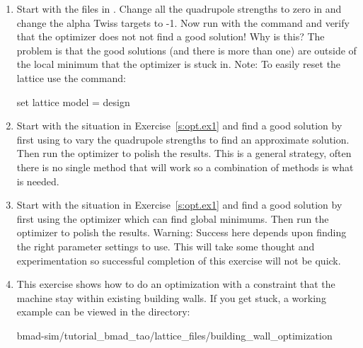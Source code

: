 \documentclass{hitec}     %
\begin{document}
{\begin{enumerate}[label=\thesection.\arabic{enumi}]
\item
\label{s:opt.ex1}
Start with the files in . Change
all the quadrupole strengths to zero in  and change the alpha Twiss  targets
to -1. Now run with the  command and verify that the optimizer does not not find a good
solution! Why is this? The problem is that the good solutions (and there is more than one) are
outside of the local minimum that the optimizer is stuck in. 
Note: To easily reset the lattice use the command:
\begin{code}
set lattice model = design
\end{code}
%
\item
Start with the situation in Exercise~\ref{s:opt.ex1} and find a good solution by first using
 to vary the quadrupole strengths to find an approximate solution. Then run the
 optimizer to polish the results. This is a general strategy, often there is no single method
that will work so a combination of methods is what is needed.
%
\item
Start with the situation in Exercise~\ref{s:opt.ex1} and find a good solution by first using the
 optimizer which can find global minimums. Then run the  optimizer to polish the
results. Warning: Success here depends upon finding the right  parameter settings to
use. This will take some thought and experimentation so successful completion of this exercise will
not be quick.
%
\item
This exercise shows how to do an optimization with a constraint that the machine stay within
existing building walls. If you get stuck, a working example can be viewed in the
directory:
\begin{code}
bmad-sim/tutorial_bmad_tao/lattice_files/building_wall_optimization
\end{code}


\end{enumerate}}
\end{document}
